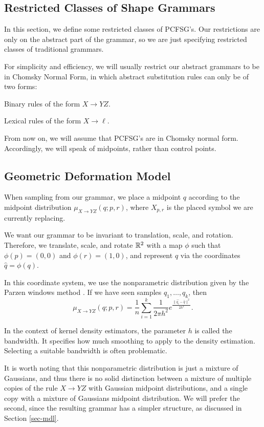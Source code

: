 \documentclass{article}
\begin{document}
\subsection{Restricted Classes of Shape Grammars}

In this section, we define some restricted classes of PCFSG's. Our
restrictions are only on the abstract part of the grammar, so we are
just specifying restricted classes of traditional grammars.

For simplicity and efficiency, we will usually restrict our abstract
grammars to be in Chomsky Normal Form, in which abstract substitution
rules can only be of two forms: 
\bitem
\item Binary rules of the form $X \to Y Z$.
\item Lexical rules of the form $X \to \ell$.
\eitem 

From now on, we will assume that PCFSG's are in Chomsky normal form.
Accordingly, we will speak of midpoints, rather than control points.

\subsection{Geometric Deformation Model}
\label{sec-deform}

When sampling from our grammar, we place a midpoint $q$ according to
the midpoint distribution $\mu_{X\to YZ}(q; p, r)$, where $X_{p,r}$ is
the placed symbol we are currently replacing.

We want our grammar to be invariant to translation, scale, and
rotation. Therefore, we translate, scale, and rotate $\mathbb{R}^2$ with a
map $\phi$ such that $\phi(p) =(0,0)$ and $\phi(r) =(1,0)$, and
represent $q$ via the coordinates $\widehat{q} = \phi(q)$.

In this coordinate system, we use the nonparametric distribution given
by the Parzen windows method \cite{parzen}. If we have seen samples
$q_1, \dots, q_k$, then
$$\mu_{X\to YZ}(q ; p, r) = \frac{1}{n} \sum_{i=1}^{k}
\frac{1}{2\pi h^2} e^{\frac{\| \widehat{q_i} - \widehat{q}\|^2}{2h^2}}.$$

In the context of kernel density estimators, the parameter $h$ is
called the bandwidth. It specifies how much smoothing to apply to the
density estimation. Selecting a suitable bandwidth is often
problematic. 

It is worth noting that this nonparametric distribution is just a
mixture of Gaussians, and thus there is no solid distinction between a
mixture of multiple copies of the rule $X\to YZ$ with Gaussian
midpoint distributions, and a single copy with a mixture of Gaussians
midpoint distribution. We will prefer the second, since the resulting
grammar has a simpler structure, as discussed in Section \ref{sec-mdl}.
\end{document}
